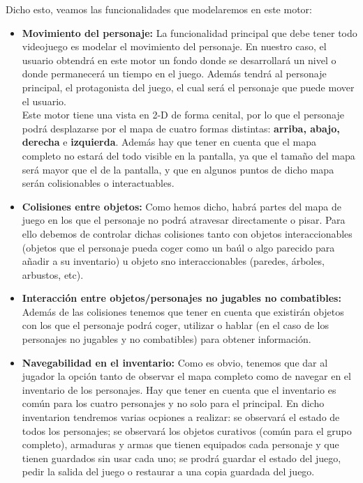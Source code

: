 \documentclass[a4paper,10pt]{article}
\begin{document}
Dicho esto, veamos las funcionalidades que modelaremos en este motor:
\begin{itemize}
\item \textbf{Movimiento del personaje:} La funcionalidad principal que debe
  tener todo videojuego es modelar el movimiento del personaje. En nuestro caso,
  el usuario obtendrá en este motor un fondo donde se desarrollará un nivel o
  donde permanecerá un tiempo en el juego. Además tendrá al personaje principal,
  el protagonista del juego, el cual será el personaje que puede mover el usuario. \\

  Este motor tiene una vista en 2-D de forma cenital, por lo que el personaje
  podrá desplazarse por el mapa de cuatro formas distintas: \textbf{arriba,
    abajo, derecha} e \textbf{izquierda}. Además hay que tener en cuenta que el
  mapa completo no estará del todo visible en la pantalla, ya que el tamaño del
  mapa será mayor que el de la pantalla, y que en algunos puntos de dicho mapa
  serán colisionables o interactuables. \\

\item \textbf{Colisiones entre objetos:} Como hemos dicho, habrá partes del mapa
  de juego en los que el personaje no podrá atravesar directamente o pisar. Para
  ello debemos de controlar dichas colisiones tanto con objetos interaccionables
  (objetos que el personaje pueda coger como un baúl o algo parecido para añadir
  a su inventario) u objeto sno interaccionables (paredes, árboles, arbustos, etc).

\item \textbf{Interacción entre objetos/personajes no jugables no combatibles:}
  Además de las colisiones tenemos que tener en cuenta que existirán objetos con
  los que el personaje podrá coger, utilizar o hablar (en el caso de los
  personajes no jugables y no combatibles) para obtener información. 

\item \textbf{Navegabilidad en el inventario:} Como es obvio, tenemos que dar al
  jugador la opción tanto de observar el mapa completo como de navegar en el
  inventario de los personajes. Hay que tener en cuenta que el inventario es
  común para los cuatro personajes y no solo para el principal. En dicho
  inventarion tendremos varias ocpiones a realizar: se observará el estado de
  todos los personajes; se observará los objetos curativos (común para el grupo
  completo), armaduras y armas que tienen equipados cada personaje y que tienen
  guardados sin usar cada uno; se prodrá guardar el estado del juego, pedir la
  salida del juego o restaurar a una copia guardada del juego.

\end{itemize}
\end{document}
